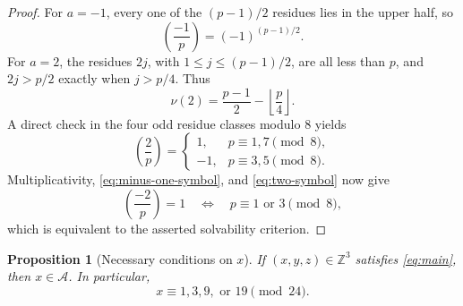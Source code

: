 \documentclass[11pt,a4paper]{amsart}
\newtheorem{proposition}[theorem]{Proposition}
\theoremstyle{definition}
\newcommand{\Z}{\mathbb Z}
\newcommand{\Acal}{\mathcal A}
\newcommand{\leg}[2]{\left(\frac{#1}{#2}\right)}
\numberwithin{equation}{section}
\begin{document}
\begin{proof}
For \(a=-1\), every one of the \((p-1)/2\) residues lies in the upper half, so
\begin{equation}
 \leg{-1}{p}=(-1)^{(p-1)/2}.
 \label{eq:minus-one-symbol}
\end{equation}
For \(a=2\), the residues \(2j\), with \(1\leq j\leq(p-1)/2\), are all less than
\(p\), and \(2j>p/2\) exactly when \(j>p/4\).  Thus
\begin{equation}
 \nu(2)=\frac{p-1}{2}-\left\lfloor\frac p4\right\rfloor.
 \label{eq:nu-two}
\end{equation}
A direct check in the four odd residue classes modulo \(8\) yields
\begin{equation}
 \leg2p=
 \begin{cases}
 1,&p\equiv1,7\pmod8,\\
 -1,&p\equiv3,5\pmod8.
 \end{cases}
 \label{eq:two-symbol}
\end{equation}
Multiplicativity, \eqref{eq:minus-one-symbol}, and \eqref{eq:two-symbol} now give
\begin{equation}
 \leg{-2}{p}=1
 \quad\Longleftrightarrow\quad
 p\equiv1\text{ or }3\pmod8,
\end{equation}
which is equivalent to the asserted solvability criterion.
\end{proof}

\begin{proposition}[Necessary conditions on \(x\)]
\label{prop:local-restrictions}
If \((x,y,z)\in\Z^3\) satisfies \eqref{eq:main}, then \(x\in\Acal\).  In particular,
\begin{equation}
 x\equiv1,3,9,\text{ or }19\pmod{24}.
 \label{eq:x-mod24}
\end{equation}
\end{proposition}
\end{document}
